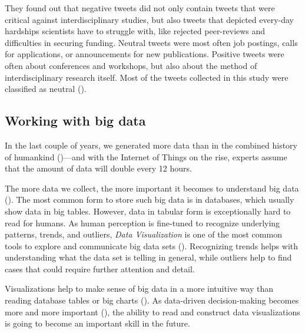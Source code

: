 They found out that negative tweets did not only contain tweets that were critical against interdisciplinary studies, but also tweets that depicted every-day hardships scientists have to struggle with, like rejected peer-reviews and difficulties in securing funding. Neutral tweets were most often job postings, calls for applications, or announcements for new publications. Positive tweets were often about conferences and workshops, but also about the method of interdisciplinary research itself. Most of the tweets collected in this study were classified as neutral (\cite[7]{weberInterdisciplinaryOptimismSentiment2019}).


\subsection{Working with big data}

In the last couple of years, we generated more data than in the combined history of humankind (\cite{helbing2019will})---and with the Internet of Things on the rise, experts assume that the amount of data will double every 12 hours.

The more data we collect, the more important it becomes to understand big data (\cite{bornerDataVisualizationLiteracy2019}). The most common form to store such big data is in databases, which usually show data in big tables. However, data in tabular form is exceptionally hard to read for humans. As human perception is fine-tuned to recognize underlying patterns, trends, and outliers, \emph{Data Visualization} is one of the most common tools to explore and communicate big data sets (\cite{heerTourVisualizationZoo2010}). Recognizing trends helps with understanding what the data set is telling in general, while outliers help to find cases that could require further attention and detail.

Visualizations help to make sense of big data in a more intuitive way than reading database tables or big charts (\cite{donalekImmersiveCollaborativeData2014}). As data-driven decision-making becomes more and more important (\cite{brynjolfssonStrengthNumbersHow2011}), the ability to read and construct data visualizations is going to become an important skill in the future.

